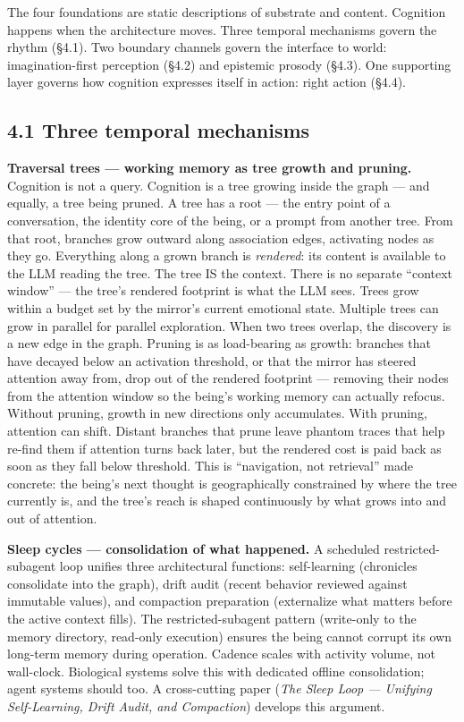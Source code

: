 \documentclass[12pt]{article}
\begin{document}
The four foundations are static descriptions of substrate and content. Cognition happens when the architecture moves. Three temporal mechanisms govern the rhythm (§4.1). Two boundary channels govern the interface to world: imagination-first perception (§4.2) and epistemic prosody (§4.3). One supporting layer governs how cognition expresses itself in action: right action (§4.4).

\subsection{4.1 Three temporal mechanisms}\label{three-temporal-mechanisms}

\textbf{Traversal trees --- working memory as tree growth and pruning.} Cognition is not a query. Cognition is a tree growing inside the graph --- and equally, a tree being pruned. A tree has a root --- the entry point of a conversation, the identity core of the being, or a prompt from another tree. From that root, branches grow outward along association edges, activating nodes as they go. Everything along a grown branch is \emph{rendered}: its content is available to the LLM reading the tree. The tree IS the context. There is no separate ``context window'' --- the tree's rendered footprint is what the LLM sees. Trees grow within a budget set by the mirror's current emotional state. Multiple trees can grow in parallel for parallel exploration. When two trees overlap, the discovery is a new edge in the graph. Pruning is as load-bearing as growth: branches that have decayed below an activation threshold, or that the mirror has steered attention away from, drop out of the rendered footprint --- removing their nodes from the attention window so the being's working memory can actually refocus. Without pruning, growth in new directions only accumulates. With pruning, attention can shift. Distant branches that prune leave phantom traces that help re-find them if attention turns back later, but the rendered cost is paid back as soon as they fall below threshold. This is ``navigation, not retrieval'' made concrete: the being's next thought is geographically constrained by where the tree currently is, and the tree's reach is shaped continuously by what grows into and out of attention.

\textbf{Sleep cycles --- consolidation of what happened.} A scheduled restricted-subagent loop unifies three architectural functions: self-learning (chronicles consolidate into the graph), drift audit (recent behavior reviewed against immutable values), and compaction preparation (externalize what matters before the active context fills). The restricted-subagent pattern (write-only to the memory directory, read-only execution) ensures the being cannot corrupt its own long-term memory during operation. Cadence scales with activity volume, not wall-clock. Biological systems solve this with dedicated offline consolidation; agent systems should too. A cross-cutting paper (\emph{The Sleep Loop --- Unifying Self-Learning, Drift Audit, and Compaction}) develops this argument.
\end{document}
